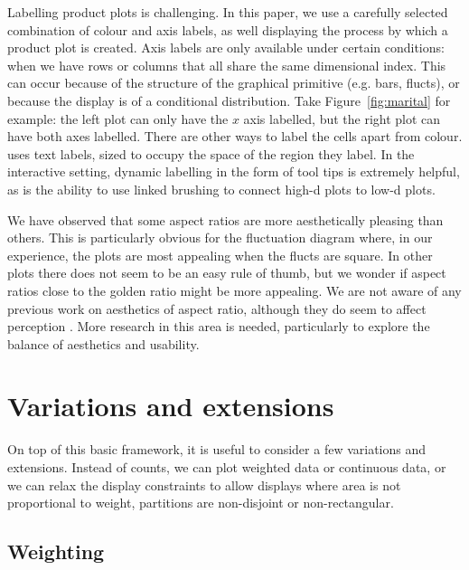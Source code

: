 \documentclass[journal]{vgtc}
\begin{document}
Labelling product plots is challenging. In this paper, we use a carefully selected combination of colour and axis labels, as well displaying the process by which a product plot is created. Axis labels are only available under certain conditions: when we have rows or columns that all share the same dimensional index. This can occur because of the structure of the graphical primitive (e.g. bars, flucts), or because the display is of a conditional distribution. Take Figure~\ref{fig:marital} for example: the left plot can only have the $x$ axis labelled, but the right plot can have both axes labelled. There are other ways to label the cells apart from colour. \citep{slingsby:2009} uses text labels, sized to occupy the space of the region they label. In the interactive setting, dynamic labelling in the form of tool tips is extremely helpful, as is the ability to use linked brushing to connect high-d plots to low-d plots.

We have observed that some aspect ratios are more aesthetically pleasing than others. This is particularly obvious for the fluctuation diagram where, in our experience, the plots are most appealing when the flucts are square. In other plots there does not seem to be an easy rule of thumb, but we wonder if aspect ratios close to the golden ratio might be more appealing. We are not aware of any previous work on aesthetics of aspect ratio, although they do seem to affect perception \citep{kong:2010}. More research in this area is needed, particularly to explore the balance of aesthetics and usability.


\section{Variations and extensions}
\label{sec:variations}

On top of this basic framework, it is useful to consider a few variations and extensions. Instead of counts, we can plot weighted data or continuous data, or we can relax the display constraints to allow displays where area is not proportional to weight, partitions are non-disjoint or non-rectangular.

\subsection{Weighting}
\label{sub:weighting}
\end{document}
